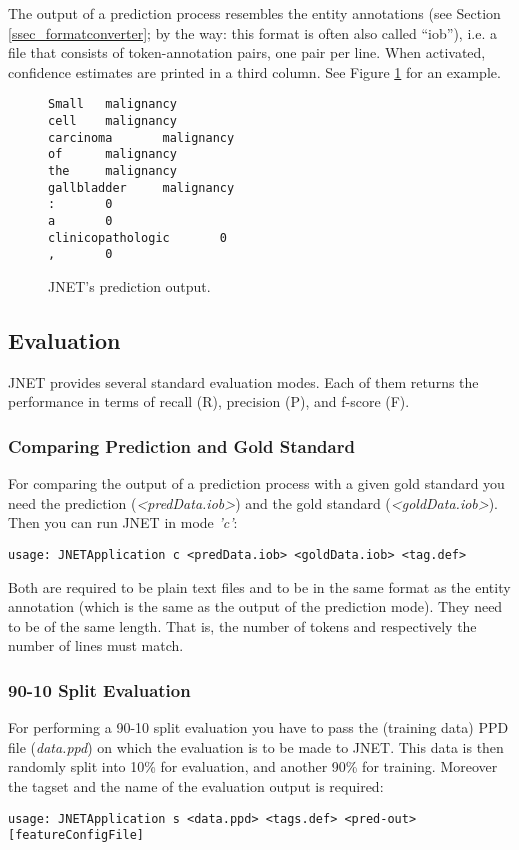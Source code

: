 \documentclass[11pt,a4paper,halfparskip]{scrartcl}
\begin{document}
The output of a prediction process resembles the entity annotations
(see Section \ref{ssec_formatconverter}; by the way: this format is
often also called ``iob''), i.e. a file that consists of
token-annotation pairs, one pair per line. When activated, confidence
estimates are printed in a third column. See Figure \ref{fig:output}
for an example.

\begin{figure}[t]
\centering
\begin{verbatim}
Small   malignancy
cell    malignancy
carcinoma       malignancy
of      malignancy
the     malignancy
gallbladder     malignancy
:       0
a       0
clinicopathologic       0
,       0
\end{verbatim}
\caption{JNET's prediction output.}
\label{fig:output}
\end{figure}



\subsection{Evaluation}
JNET provides several standard evaluation modes. Each of them returns
the performance in terms of recall (R), precision (P), and f-score
(F). 

\subsubsection{Comparing Prediction and Gold Standard}
For comparing the output of a prediction process with a given gold
standard you need the prediction (\textit{<predData.iob>}) and the
gold standard (\textit{<goldData.iob>}). Then you can run JNET in mode
\textit{'c'}:
 
\begin{verbatim}
usage: JNETApplication c <predData.iob> <goldData.iob> <tag.def>
\end{verbatim}

Both are required to be plain text files and to be in the same format
as the entity annotation (which is the same as the output of the
prediction mode). They need to be of the same length. That is, the
number of tokens and respectively the number of lines must match.

\subsubsection{90-10 Split Evaluation}
For performing a 90-10 split evaluation you have to pass the
(training data) PPD file (\textit{data.ppd}) on which the evaluation
is to be made to JNET. This data is then randomly split into 10\% for
evaluation, and another 90\% for training. Moreover the
tagset and the name of the evaluation output is required:
\begin{verbatim}
usage: JNETApplication s <data.ppd> <tags.def> <pred-out>
[featureConfigFile]
\end{verbatim}
\end{document}
